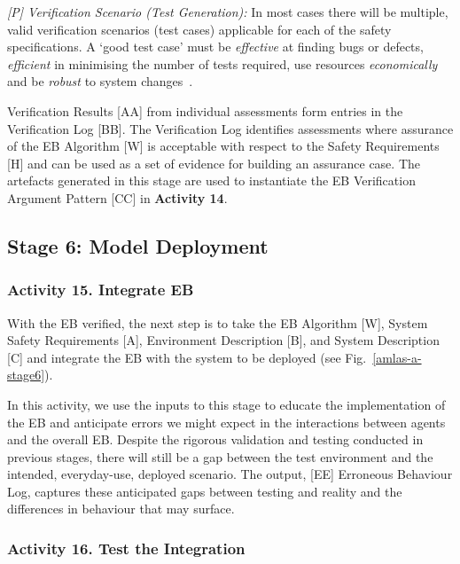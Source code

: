 \documentclass[runningheads]{llncs}
\begin{document}
\emph{[P] Verification Scenario (Test Generation):} In most cases there will be multiple, valid verification scenarios (test cases) applicable for each of the safety specifications. A `good test case' must be \emph{effective} at finding bugs or defects, \emph{efficient} in minimising the number of tests required, use resources \emph{economically} and be \emph{robust} to system changes~\cite{Fewster1999}. 

Verification Results [AA] from individual assessments form entries in the Verification Log [BB]. The Verification Log identifies assessments where assurance of the EB Algorithm [W] is acceptable with respect to the Safety Requirements [H] and can be used as a set of evidence for building an assurance case. %
The artefacts generated in this stage are used to instantiate the EB Verification Argument Pattern [CC] in \textbf{Activity 14}.


\subsection{Stage 6: Model Deployment} \label{framework-stage6}
\subsubsection*{Activity 15. Integrate EB}

With the EB verified, the next step is to take the EB Algorithm [W], System Safety Requirements [A], Environment Description [B], and System Description [C] and integrate the EB with the system to be deployed (see Fig.~\ref{amlas-a-stage6}). 

In this activity, we use the inputs to this stage to educate the implementation of the EB and anticipate errors we might expect in the interactions between agents and the overall EB. Despite the rigorous validation and testing conducted in previous stages, there will still be a gap between the test environment and the intended, everyday-use, deployed scenario. The output, [EE] Erroneous Behaviour Log, captures these anticipated gaps between testing and reality and the differences in behaviour that may surface. 

\subsubsection*{Activity 16. Test the Integration}
\end{document}

